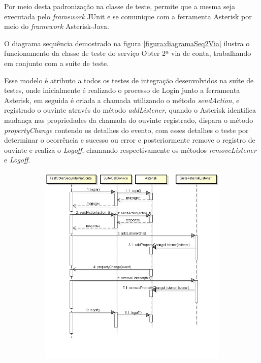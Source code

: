 Por meio desta padronização na classe de teste, permite que a mesma seja executada pelo \textit{framework} JUnit e se comunique com a ferramenta Asterisk por meio do \textit{framework} Asterisk-Java.

O diagrama sequência demostrado na figura \ref{figura:diagramaSeq2Via} ilustra o funcionamento da classe de teste do serviço Obter 2ª via de conta, trabalhando em conjunto com a suíte de teste.

Esse modelo é atributo a todos os testes de integração desenvolvidos na suíte de testes, onde inicialmente é realizado o processo de Login junto a ferramenta Asterisk, em seguida é criada a chamada utilizando o método \textit{sendAction}, e registrado o ouvinte através do método \textit{addListener}, quando o Asterisk identifica mudança nas propriedades da chamada do ouvinte registrado, dispara o método \textit{propertyChange} contendo os detalhes do evento, com esses detalhes o teste por determinar o ocorrência e sucesso ou error e posteriormente remove o registro de ouvinte e realiza o \textit{Logoff}, chamando respectivamente os métodos \textit{removeListener} e \textit{Logoff}.

\begin{figure}[H]
	\centering
	\caption{\textbf{Diagrama de sequência utilizando a suíte de teste.}}
	\label{figura:diagramaSeq2Via}
	\begin{subfigure}[H]{\textwidth}
		\centering
		\includegraphics{figuras/diagramaSequenciaObter2Via.png}
	\end{subfigure}
\end{figure}


